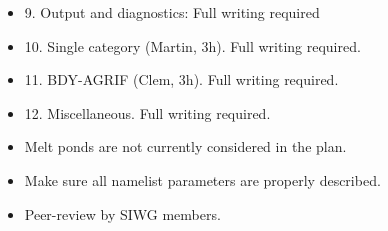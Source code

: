 \documentclass[../../tex_main/NEMO_manual]{subfiles}
\begin{document}
\begin{itemize}
\item 9. Output and diagnostics: Full writing required

\item 10. Single category (Martin, 3h). Full writing required.

\item 11. BDY-AGRIF (Clem, 3h). Full writing required.

\item 12. Miscellaneous. Full writing required.

\item Melt ponds are not currently considered in the plan.

\item Make sure all namelist parameters are properly described.

\item Peer-review by SIWG members.

\end{itemize}
\end{document}

